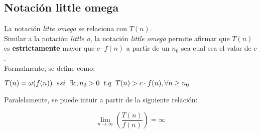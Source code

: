 \subsection{Notación little omega}
La notación \textit{litte omega} se relaciona con $T(n)$.\\

Similar a la notación \textit{little o}, la notación \textit{little omega}
permite afirmar que $T(n)$ es \textbf{estrictamente} mayor que $c\cdot f(n)$
a partir de un $n_{0}$ sea cual sea el valor de $c$.\\

Formalmente, se define como:

\begin{center}
  \(T(n) = \omega(f(n))\hspace{0.2cm}ssi\hspace{0.2cm}\exists c, n_{0} > 0\hspace{0.2cm}t.q\hspace{0.2cm}T(n) > c\cdot f(n), \forall{n} \geq n_{0}\)
\end{center}

Paralelamente, se puede intuir a partir de la siguiente relación:

\begin{center}
  \[
    \lim_{n\to\infty} \left(\frac{T(n)}{f(n)}\right) = \infty
  \]
\end{center}
